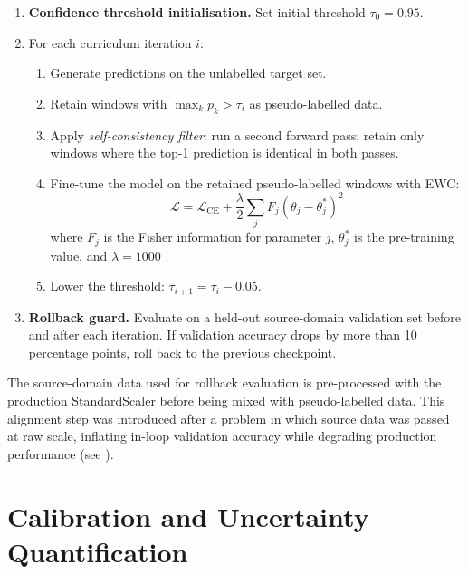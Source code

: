 \begin{enumerate}
  \item \textbf{Confidence threshold initialisation.} Set initial threshold
        $\tau_0 = 0.95$.
  \item For each curriculum iteration $i$:
    \begin{enumerate}[label=\alph*.]
      \item Generate predictions on the unlabelled target set.
      \item Retain windows with $\max_k p_k > \tau_i$ as pseudo-labelled data.
      \item Apply \textit{self-consistency filter}: run a second forward pass;
            retain only windows where the top-1 prediction is identical in both
            passes.
      \item Fine-tune the model on the retained pseudo-labelled windows with EWC:
            \[
              \mathcal{L} = \mathcal{L}_{\text{CE}} +
                \frac{\lambda}{2} \sum_j F_j (\theta_j - \theta_j^*)^2
            \]
            where $F_j$ is the Fisher information for parameter $j$,
            $\theta_j^*$ is the pre-training value, and $\lambda = 1000$
            \citep{kirkpatrick2017overcoming}.
      \item Lower the threshold: $\tau_{i+1} = \tau_i - 0.05$.
    \end{enumerate}
  \item \textbf{Rollback guard.} Evaluate on a held-out source-domain
        validation set before and after each iteration.
        If validation accuracy drops by more than 10 percentage points,
        roll back to the previous checkpoint.
\end{enumerate}

The source-domain data used for rollback evaluation is pre-processed with
the production StandardScaler before being mixed with pseudo-labelled data.
This alignment step was introduced after a problem in which source data was
passed at raw scale, inflating in-loop validation accuracy while degrading
production performance (see ).

\section{Calibration and Uncertainty Quantification}
\label{sec:calibration}

